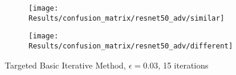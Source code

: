 \documentclass[draft,final]{vutinfth} %
\begin{document}
\begin{figure}[h]
  \begin{subfigure}[b]{0.75\columnwidth}
		\centering
    \texttt{[image: Results/confusion\_matrix/resnet50\_adv/similar]}
    \label{fig:exp:cm:resnet50_gradreg_adv:similar}
  \end{subfigure}
  \begin{subfigure}[b]{0.75\columnwidth}
		\centering
    \texttt{[image: Results/confusion\_matrix/resnet50\_adv/different]}
    \label{fig:exp:cm:resnet50_adv:different}
  \end{subfigure}
  \caption{Targeted Basic Iterative Method, $\epsilon = 0.03$, 15 iterations}
  \label{fig:exp:cm:resnet50_adv}
\end{figure}
%
%
%
\end{document}
